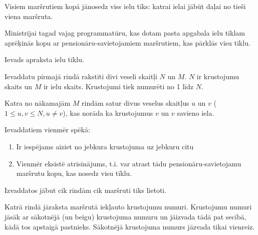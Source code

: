 \documentclass{boi2014-lv}
\begin{document}
		Visiem maršrutiem kopā jānosedz viss ielu tīks: katrai ielai jābūt daļai no tieši viena maršruta.

    \Task
		
		Ministrijai tagad vajag programmatūru, kas dotam pasta apgabala ielu tīklam aprēķinās kopu ar pensionāru-savietojamiem maršrutiem, kas pārklās visu tīklu.

    \Input

		Ievads apraksta ielu tīklu.
		
		Ievaddatu pirmajā rindā rakstīti divi veseli skaitļi $N$ un $M$. $N$ ir krustojumu skaits un $M$ ir ielu skaits. Krustojumi tiek numurēti no 1 līdz $N$.

		Katra no nākamajām $M$ rindām satur divus veselus skaitļus $u$ un $v$ ($1 \le u, v \le N, u \neq v$), kas norāda ka krustojumus $v$ un $v$ savieno iela.

		Ievaddatiem vienmēr spēkā:
    \begin{enumerate}
        \item Ir iespējams aiziet no jebkura krustojuma uz jebkuru citu %
        \item Vienmēr eksistē atrisinājums, t.i. var atrast tādu pensionāru-savietojamu maršrutu kopu, kas nosedz visu tīklu. %
    \end{enumerate}

    \Output
		Izvaddatos jābut cik rindām cik maršruti tiks lietoti.
		

		 Katrā rindā jāraksta maršrutā iekļauto krustojumu numuri. Krustojumu numuri jāsāk ar sākotnējā (un beigu) krustojuma numuru un jāizvada tādā pat secībā, kādā tos apstaigā pastnieks. Sākotnējā krustojuma numurs jāzvada tikai vienreiz.
\end{document}

